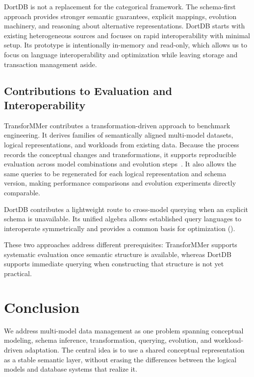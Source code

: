 DortDB is not a replacement for the categorical framework. The schema-first approach provides stronger semantic guarantees, explicit mappings, evolution machinery, and reasoning about alternative representations. DortDB starts with existing heterogeneous sources and focuses on rapid interoperability with minimal setup. Its prototype is intentionally in-memory and read-only, which allows us to focus on language interoperability and optimization while leaving storage and transaction management aside.

\subsection{Contributions to Evaluation and Interoperability}

TransforMMer contributes a transformation-driven approach to benchmark engineering. It derives families of semantically aligned multi-model datasets, logical representations, and workloads from existing data. Because the process records the conceptual changes and transformations, it supports reproducible evaluation across model combinations and evolution steps~. It also allows the same queries to be regenerated for each logical representation and schema version, making performance comparisons and evolution experiments directly comparable.

DortDB contributes a lightweight route to cross-model querying when an explicit schema is unavailable. Its unified algebra allows established query languages to interoperate symmetrically and provides a common basis for optimization ().

These two approaches address different prerequisites: TransforMMer supports systematic evaluation once semantic structure is available, whereas DortDB supports immediate querying when constructing that structure is not yet practical.


\section{Conclusion}

We address multi-model data management as one problem spanning conceptual modeling, schema inference, transformation, querying, evolution, and workload-driven adaptation. The central idea is to use a shared conceptual representation as a stable semantic layer, without erasing the differences between the logical models and database systems that realize it.

